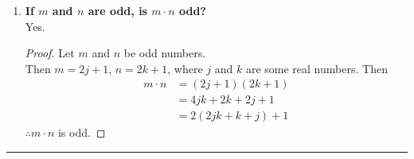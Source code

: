 \documentclass[../notes.tex]{subfiles}
\begin{document}
\begin{enumerate}
\begin{proof}
\begin{align*}
						m + n &= 2j + 2k\\
						&= 2(j + k)
					\end{align*}
					As the sum of the two numbers is a multiple of $2$, $m + n$ is even.
				\end{proof}
				\item \textbf{If $m$ and $n$ are odd, is $m \cdot n$ odd?}\\
				Yes.
				\begin{proof}
					Let $m$ and $n$ be odd numbers.\\
					Then $m = 2j + 1$, $n = 2k + 1$, where $j$ and $k$ are some real numbers.
					Then
					\begin{align*}
						m\cdot n &= (2j + 1)(2k + 1)\\
						&= 4jk + 2k + 2j + 1\\
						&= 2(2jk + k + j) + 1
					\end{align*}
					$\therefore m \cdot n$ is odd. 
				\end{proof}
			\end{enumerate}
	\noindent\rule{\textwidth}{0.4pt}
\end{document}
